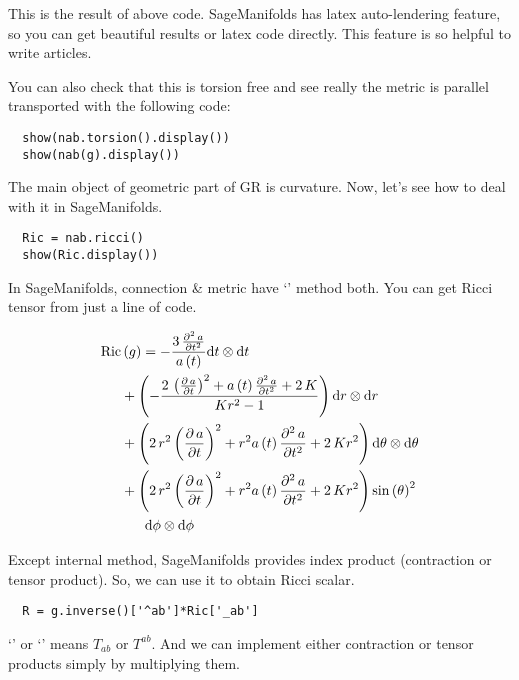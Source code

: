 \documentclass[%
 reprint,
 amsmath,amssymb,
 aps,
]{revtex4-1}
\begin{document}
This is the result of above code. SageManifolds has latex auto-lendering
feature, so you can get beautiful results or latex code directly. This feature
is so helpful to write articles.

You can also check that this is torsion free and see really the metric is
parallel transported with the following code:
\begin{lstlisting}
  show(nab.torsion().display())
  show(nab(g).display())
\end{lstlisting}

The main object of geometric part of GR is curvature. Now, let's see how to deal
with it in SageManifolds.

\begin{lstlisting}
  Ric = nab.ricci()
  show(Ric.display())
\end{lstlisting}
In SageManifolds, connection \& metric have `' method both. You
can get Ricci tensor from just a line of code.

\newpage

\begin{equation}
  \begin{aligned}
    \mathrm{Ric} &\left(g\right) = -\frac{3 \, \frac{\partial^2\,a}{\partial t ^ 2}}{a\left(t\right)} \mathrm{d} t\otimes \mathrm{d} t\\
    &+ \left( -\frac{2 \, \left(\frac{\partial\,a}{\partial t}\right)^{2} + a\left(t\right) \frac{\partial^2\,a}{\partial t ^ 2} + 2 \, K}{K r^{2} - 1} \right) \mathrm{d} r\otimes \mathrm{d} r \\
    &+ \left( 2 \, r^{2} \left(\frac{\partial\,a}{\partial t}\right)^{2} + r^{2} a\left(t\right) \frac{\partial^2\,a}{\partial t ^ 2} + 2 \, K r^{2} \right) \mathrm{d} {\theta}\otimes \mathrm{d} {\theta}\\
    &+ {\left(2 \, r^{2} \left(\frac{\partial\,a}{\partial t}\right)^{2} + r^{2} a\left(t\right) \frac{\partial^2\,a}{\partial t ^ 2} + 2 \, K r^{2}\right)} \sin\left({\theta}\right)^{2} \\
    &\HS\HS\mathrm{d} {\phi}\otimes \mathrm{d} {\phi}
  \end{aligned}
\end{equation}

\vs

Except internal method, SageManifolds provides index product (contraction or
tensor product). So, we can use it to obtain Ricci scalar.

\begin{lstlisting}
  R = g.inverse()['^ab']*Ric['_ab']
\end{lstlisting}
`' or `' means
$T_{ab}$ or $T^{ab}$. And we can implement either contraction or tensor products
simply by multiplying them.
\end{document}
